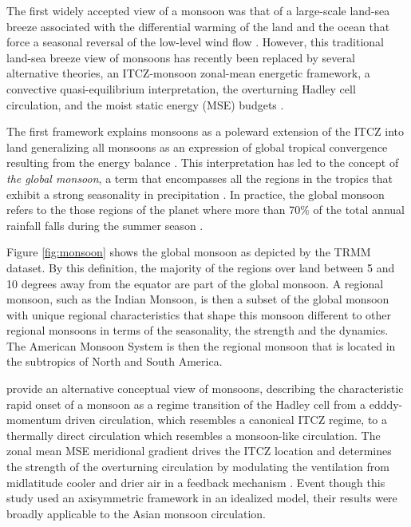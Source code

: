 The first widely accepted view of a monsoon was that of a large-scale land-sea breeze associated with the differential warming of the land and the ocean that force a seasonal reversal of the low-level wind flow \citep{halley}. However, this traditional land-sea breeze view of monsoons has recently been replaced by several alternative theories, an ITCZ-monsoon zonal-mean energetic framework, a convective quasi-equilibrium interpretation, the overturning Hadley cell circulation, and the moist static energy (MSE) budgets \citep{biasutti2018global,hill2019,geen2020}. 

The first framework  explains monsoons as a poleward extension of the ITCZ into land  generalizing all monsoons as an expression of global tropical convergence resulting from the energy balance \citep{chao2001origin,gadgil2018}. This interpretation has led to the concept of \textit{the global monsoon}, a term that encompasses all the regions in the tropics that exhibit a strong seasonality in precipitation \citep{zhou2016,gadgil2018}. 
In practice, the global monsoon refers to the those regions of the planet where more than 70\% of the total annual rainfall falls during the summer season \citep{zhou2016,wang2017}.

Figure \ref{fig:monsoon} shows the global monsoon as depicted by the TRMM dataset. By this definition, the majority of the regions over land between 5 and 10 degrees away from the equator are part of the global monsoon.
A regional monsoon, such as the Indian Monsoon, is then a subset of the global monsoon with unique regional characteristics that shape this monsoon different to other regional monsoons in terms of the seasonality, the strength and the dynamics. 
The American Monsoon System is then the regional monsoon that is located in the subtropics of North and South America. 



\cite{bordoni2008monsoons} provide an alternative conceptual view of monsoons, describing the characteristic rapid onset of a monsoon as a regime transition of the Hadley cell from a edddy-momentum  driven circulation, which resembles a canonical ITCZ regime, to a thermally direct circulation which resembles a monsoon-like circulation. The zonal mean MSE meridional gradient drives the ITCZ location and determines the strength of the overturning circulation by modulating the ventilation from midlatitude cooler and drier air in a feedback mechanism \citep{geen2020}. Event though this study used an axisymmetric framework in an idealized model, their results were broadly applicable to the Asian monsoon circulation. 




